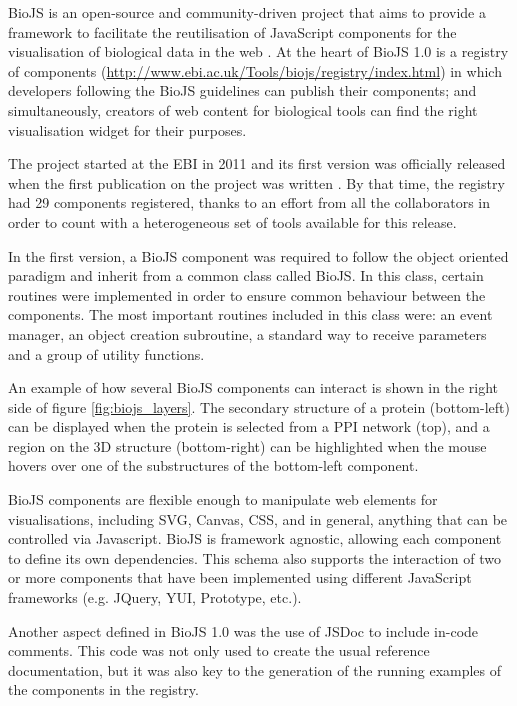 BioJS is an open-source and community-driven project that aims to provide a framework to facilitate the reutilisation of JavaScript components for the visualisation of biological data in the web \cite{GOM2013}. At the heart of BioJS 1.0 is a registry of components (\url{http://www.ebi.ac.uk/Tools/biojs/registry/index.html}) in which developers following the BioJS guidelines can publish their components; and simultaneously, creators of web content for biological tools can find the right visualisation widget for their purposes.

The project started at the EBI in 2011 and its first version was officially released when the first publication on the project was written \cite{GOM2013}. By that time, the registry had 29 components registered, thanks to an effort from all the collaborators in order to count with a heterogeneous set of tools available for this release.

In the first version, a BioJS component was required to follow the object oriented paradigm and inherit from a common class called BioJS. In this class, certain routines were implemented in order to ensure common behaviour between the components. The most important routines included in this class were: an event manager, an object creation subroutine, a standard way to receive parameters and a group of utility functions.

An example of how several BioJS components can interact is shown in the right side of figure \ref{fig:biojs_layers}. The secondary structure of a protein (bottom-left) can be displayed when the protein is selected from a PPI network (top), and a region on the 3D structure (bottom-right) can be highlighted when the mouse hovers over one of the substructures of the bottom-left component.

BioJS components are flexible enough to manipulate web elements for visualisations, including SVG, Canvas, CSS, and in general, anything that can be controlled via Javascript. BioJS is framework agnostic, allowing each component to define its own dependencies. This schema also supports the interaction of two or more components that have been implemented using different JavaScript frameworks (e.g. JQuery, YUI, Prototype, etc.).
 
Another aspect defined in BioJS 1.0 was the use of JSDoc to include in-code comments. This code was not only used to create the usual reference documentation, but it was also key to the generation of the running examples of the components in the registry. 

